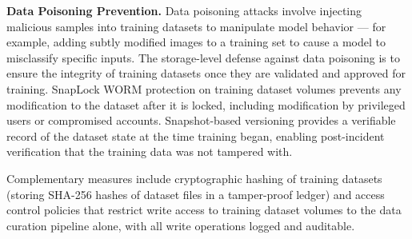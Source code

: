 \begin{securitybox}
\textbf{Data Poisoning Prevention.}
Data poisoning attacks involve injecting malicious samples into training datasets to manipulate model behavior --- for example, adding subtly modified images to a training set to cause a model to misclassify specific inputs. The storage-level defense against data poisoning is to ensure the integrity of training datasets once they are validated and approved for training. SnapLock WORM protection on training dataset volumes prevents any modification to the dataset after it is locked, including modification by privileged users or compromised accounts. Snapshot-based versioning provides a verifiable record of the dataset state at the time training began, enabling post-incident verification that the training data was not tampered with.

Complementary measures include cryptographic hashing of training datasets (storing SHA-256 hashes of dataset files in a tamper-proof ledger) and access control policies that restrict write access to training dataset volumes to the data curation pipeline alone, with all write operations logged and auditable.

\end{securitybox}
